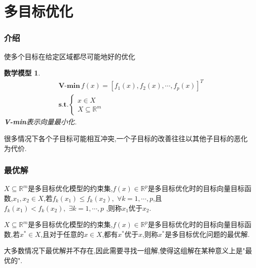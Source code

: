 \documentclass{beamer}
\newtheorem*{mathmodle}{数学模型}
\begin{document}
	\section{多目标优化}
		\begin{frame}
			\frametitle{介绍}
			使多个目标在给定区域都尽可能地好的优化
			\begin{mathmodle}
				\begin{eqnarray*}
					&\textbf{V-min} \,f(x)=[f_1(x),f_2(x),\cdots,f_p(x)]^T\\
					&\textbf{s.t.} \left\{\begin{array}{c}
						x\in X\\
					X \subseteq \mathbb{R}^m 
					\end{array} \right.
				\end{eqnarray*}
				\textbf{V-min}表示向量最小化.
			\end{mathmodle}
		很多情况下各个子目标可能相互冲突,一个子目标的改善往往以其他子目标的恶化为代价.
		\end{frame}
	\begin{frame}
		\frametitle{最优解}
	\begin{definition}
		$X\subseteq \mathbb{R}^m $是多目标优化模型的约束集,$f(x)\in \mathbb{R}^p $是多目标优化时的目标向量目标函数,$x_1,x_2\in X$,若$f_k(x_1)\le f_k(x_2), \,\, \forall k=1,\cdots,p$,且$f_k(x_1)< f_k(x_2), \,\, \exists k=1,\cdots,p$ ,则称$x_1$优于$x_2$.
	\end{definition}
	\begin{definition}
		$X\subseteq \mathbb{R}^m $是多目标优化模型的约束集,$f(x)\in \mathbb{R}^p $是多目标优化时的目标向量目标函数,若$x^*\in X$,且对于任意的$x\in X$,都有$x^*$优于$x$,则称$x^*$是多目标优化问题的最优解.	
	\end{definition}
	大多数情况下最优解并不存在,因此需要寻找一组解,使得这组解在某种意义上是"最优的".	
	
	\end{frame}
\end{document}

